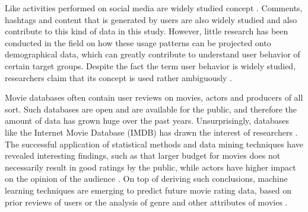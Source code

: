 \documentclass[conference]{IEEEtran}
\begin{document}
Like activities performed on social media are widely studied concept \cite{bakhshi2014faces, jang2015noreciprocity, jang2016teensengagemorewithfewerphotos, ottoni2013ladies}. Comments, hashtags and content that is generated by users are also widely studied \cite{bakhshi2014faces, jang2016teensengagemorewithfewerphotos, hu2014we, bakhshi2014faces} and also contribute to this kind of data in this study. However, little research has been conducted in the field on how these usage patterns can be projected onto demographical data, which can greatly contribute to understand user behavior of certain target groups. Despite the fact the term user behavior is widely studied, researchers claim that its concept is used rather ambiguously \cite{waheed2017investigation}.

Movie databases often contain user reviews on movies, actors and producers of all sort. Such databases are open and are available for the public, and therefore the amount of data has grown huge over the past years. Unsurprisingly, databases like the Internet Movie Database (IMDB) has drawn the interest of researchers \cite{saraee2004data, kabinsingha2012movie, sumathi2013performance}. The successful application of statistical methods and data mining techniques have revealed interesting findings, such as that larger budget for movies does not necessarily result in good ratings by the public, while actors have higher impact on the opinion of the audience \cite{saraee2004data}. On top of deriving such conclusions, machine learning techniques are emerging to predict future movie rating data, based on prior reviews of users \cite{saraee2004data} or the analysis of genre and other attributes of movies \cite{kabinsingha2012movie}.
\end{document}

